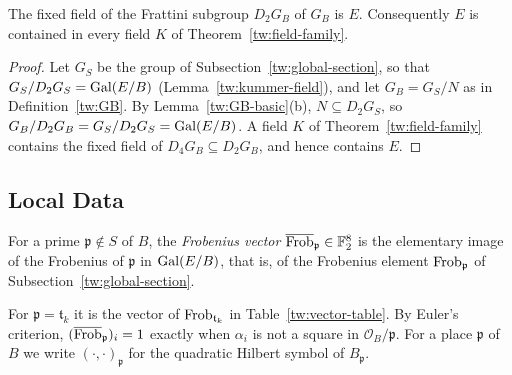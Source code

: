 \begin{lemma}\label{gf:in-tower}
The fixed field of the Frattini subgroup $D_2G_B$ of $G_B$ is $E$.
Consequently $E$ is contained in every field $K$ of
Theorem~\ref{tw:field-family}.
\end{lemma}

\begin{proof}
Let $G_S$ be the group of Subsection~\ref{tw:global-section}, so
that $G_S/D_2G_S=\operatorname{Gal}(E/B)$ (Lemma~\ref{tw:kummer-field}), and let
$G_B=G_S/N$ as in Definition~\ref{tw:GB}. By Lemma~\ref{tw:GB-basic}(b),
$N\subseteq D_2G_S$, so
$G_B/D_2G_B=G_S/D_2G_S=\operatorname{Gal}(E/B)$. A field $K$ of
Theorem~\ref{tw:field-family} contains the fixed field of
$D_4G_B\subseteq D_2G_B$, and hence contains $E$.
\end{proof}

\subsection{Local Data}

\begin{definition}\label{gf:frobenius-vector}
For a prime $\mathfrak p\notin S$ of $B$, the \emph{Frobenius vector}
$\overline{\operatorname{Frob}}_{\mathfrak p}\in\mathbb F_2^8$ is the elementary image of the
Frobenius of $\mathfrak p$ in $\operatorname{Gal}(E/B)$, that is, of the Frobenius element
$\operatorname{Frob}_{\mathfrak p}$ of Subsection~\ref{tw:global-section}.
\end{definition}

For $\mathfrak p=\mathfrak t_k$ it is the vector of $\operatorname{Frob}_{\mathfrak t_k}$ in
Table~\ref{tw:vector-table}. By Euler's criterion,
$(\overline{\operatorname{Frob}}_{\mathfrak p})_i=1$ exactly when $\alpha_i$ is not a
square in $\mathcal O_B/\mathfrak p$. For a
place $\mathfrak p$ of $B$ we write $(\cdot,\cdot)_{\mathfrak p}$ for the
quadratic Hilbert symbol of $B_{\mathfrak p}$.

